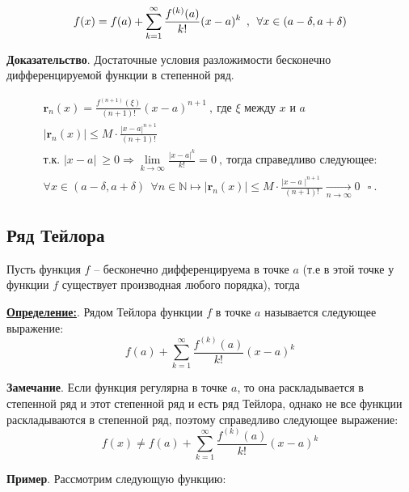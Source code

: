 \documentclass[a4paper,12pt]{article} %
\begin{document}
\begin{equation*}
 \Large \displaystyle f(x) =f(a) + \sum\limits_{k = 1}^{\infty} \frac{f^{(k)}(a)}{k!}(x-a)^k\ ,\ \forall x\in (a - \delta, a + \delta)
\end{equation*}

\textbf{Доказательство}. Достаточные условия разложимости бесконечно дифференцируемой функции в степенной ряд.

\begin{equation*}
\begin{gathered}
	\mathbf{r}_n(x) = \frac{f^{(n+1)}(\xi)}{(n+1)!}(x-a)^{n+1}\ ,\ \text{где } \xi \text{ между } x \text{ и } a  \\
	|\mathbf{r}_n(x)| \leqslant M\cdot \frac{|x - a|^{n+1}}{(n+1)!}\\
	\text{т.к.  }|x - a|\ \geqslant 0 \Rightarrow \lim\limits_{k \to \infty} \frac{|x - a|^k}{k!} = 0\ ,\ \text{тогда справедливо следующее:}\\
	\forall x \in (a - \delta, a + \delta)\ \ \forall n\in \mathbb{N} \longmapsto |\mathbf{r}_n(x)| 	\leqslant M \cdot \frac{\mid x - a\mid^{n+1}}{(n + 1)!} \underset{n \rightarrow \infty} \longrightarrow 0\ \ \ \square\ .
\end{gathered}
\end{equation*}


\subsection{Ряд Тейлора}

Пусть функция $f$ -- бесконечно дифференцируема в точке $a$ (т.е в этой точке у функции $f$ существует производная любого порядка), тогда

\underline{\textbf{Определение:}}. Рядом Тейлора функции $f$ в точке $a$ называется следующее выражение:
\begin{equation*}
f(a) + \sum\limits_{k = 1}^{\infty} \frac{f^{(k)}(a)}{k!}(x-a)^k 
\end{equation*}

\textbf{Замечание}. Если функция регулярна в точке $a$, то она раскладывается в степенной ряд и этот степенной ряд и есть ряд Тейлора, однако не все функции раскладываются в степенной ряд, поэтому справедливо следующее выражение:
\begin{equation*}
f(x) \neq f(a) + \sum\limits_{k = 1}^{\infty} \frac{f^{(k)}(a)}{k!}(x-a)^k 
\end{equation*}

\textbf{Пример}. Рассмотрим следующую функцию:
\end{document}
